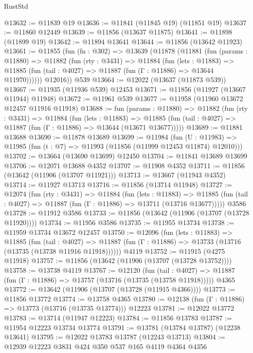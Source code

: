 \begin{lexlean}{RustStd}
\begin{coremodule}
@13632 := @11839 @19
@13636 := @11841 (@11845 @19) (@11851 @19)
@13637 := @11860 @12449
@13639 := @11856 (@13637 @11875)
@13641 := @11898 (@11899 @19)
@13642 := @11894 @13641
@13644 := @11856 (@13642 @11923)
@13661 := @11855
    (fun (fn : @302) =>
    @13639
      (@11878
        (@11881
          (fun (params : @11880) =>
          @11882
            (fun (rty : @3431) =>
            @11884
              (fun (lets : @11883) =>
              @11885 (fun (tail : @4027) => @11887 (fun (Γ : @11886) => @13644 @11970))))))
        @12016))
    @539
@13664 := @12022 (@13637 (@11873 @539))
@13667 := @11935 (@11936 @539) @12453
@13671 := @11856 (@11927 (@13667 @11944) @11948)
@13672 := @11961 @539
@13677 := @11958 (@11960 @13672 @12457 @11916 @11918)
@13688 := fun (params : @11880) =>
  @11882
    (fun (rty : @3431) =>
    @11884
      (fun (lets : @11883) =>
      @11885 (fun (tail : @4027) => @11887 (fun (Γ : @11886) => @13644 (@13671 @13677)))))
@13689 := @11881 @13688
@13690 := @11878 @13689
@13699 := @11984
    (fun (U : @11983) => @11985 (fun (t : @7) => @11993 (@11856 (@11999 @12453 @11874) @12010)))
@13702 := @13664 (@13690 @13699) @12450
@13704 := @11841 @13689 @13699
@13706 := @12071 @13688 @4352
@13707 := @11908 @4352
@13711 := @11856 (@13642 (@11906 (@13707 @11921)))
@13713 := @13667 (@11943 @4352)
@13714 := @11927 @13713
@13716 := @11856 (@13714 @11948)
@13727 := @12074
    (fun (rty : @3431) =>
    @11884
      (fun (lets : @11883) =>
      @11885 (fun (tail : @4027) => @11887 (fun (Γ : @11886) => @13711 (@13716 @13677)))))
    @3586
@13728 := @11912 @3586
@13733 := @11856 (@13642 (@11906 (@13707 (@13728 @11920))))
@13734 := @11956 @3586
@13735 := @11955 @13734
@13738 := @11959 @13734 @13672 @12457
@13750 := @12096
    (fun (lets : @11883) =>
    @11885
      (fun (tail : @4027) =>
      @11887 (fun (Γ : @11886) => @13733 (@13716 (@13735 (@13738 @11916 @11918))))))
    @4119
@13752 := @11915 (@4275 @11918)
@13757 := @11856 (@13642 (@11906 (@13707 (@13728 @13752))))
@13758 := @13738 @4119
@13767 := @12120
    (fun (tail : @4027) => @11887 (fun (Γ : @11886) => @13757 (@13716 (@13735 (@13758 @11918)))))
    @4365
@13772 := @13642 (@11906 (@13707 (@13728 (@11915 @4366))))
@13773 := @11856 @13772
@13774 := @13758 @4365
@13780 := @12138 (fun (Γ : @11886) => @13773 (@13716 (@13735 @13774))) @12223
@13781 := @12022 @13772
@13783 := @13714 (@11947 @12223)
@13784 := @11856 @13783
@13787 := @11954 @12223 @13734 @13774
@13791 := @13781 (@13784 @13787) (@12238 @13641)
@13795 := @12022 @13783 @13787 (@12243 @13713)
@13804 := @12939 @12223 @3831 @424 @350 @537 @165 @4119 @4364 @4356

\end{coremodule}
\end{lexlean}
